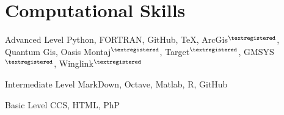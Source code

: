 \documentclass{tccv}
\begin{document}





\section{Computational Skills}

\begin{factlist}

\item{Advanced Level}
	 {Python, FORTRAN, GitHub, \TeX, ArcGis$^{\textregistered}$, Quantum Gis, Oasis Montaj$^{\textregistered}$, Target$^{\textregistered}$, GMSYS$^{\textregistered}$, Winglink$^{\textregistered}$}
\item{Intermediate Level}
     {MarkDown, Octave, Matlab, R, GitHub}
\item{Basic Level}
     {CCS, HTML, PhP}

\end{factlist}
\end{document}
